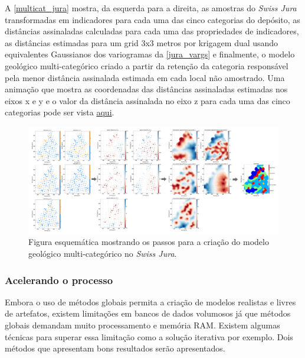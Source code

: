 A \autoref{multicat_jura} mostra, da esquerda para a direita, as amostras do \textit{Swiss Jura} transformadas em indicadores para cada uma das cinco categorias do depósito, as distâncias assinaladas calculadas para cada uma das propriedades de indicadores, as distâncias estimadas para um grid 3x3 metros por krigagem dual usando equivalentes Gaussianos dos variogramas da \autoref{jura_vargs} e finalmente, o modelo geológico multi-categórico criado a partir da retenção da categoria responsável pela menor distância assinalada estimada em cada local não amostrado. Uma animação que mostra as coordenadas das distâncias assinaladas estimadas nos eixos x e y e o valor da distância assinalada no eixo z para cada uma das cinco categorias pode ser vista  \href{https://github.com/robertorolo/assessing_geological_model_uncertainty_with_probability_fields/blob/main/anim_multicat.gif}{aqui}.

\begin{figure}[H]
	\centering
	\caption{\label{multicat_jura}Figura esquemática mostrando os passos para a criação do modelo geológico multi-categórico no \textit{Swiss Jura}.}
	\includegraphics[width=\textwidth]{capitulo_2/imagens/multi category implicit modeling.png}
\end{figure}

\subsubsection{Acelerando o processo}

Embora o uso de métodos globais permita a criação de modelos realistas e livres de artefatos, existem limitações em bancos de dados volumosos já que métodos globais demandam muito processamento e memória RAM. Existem algumas técnicas para superar essa limitação como a solução iterativa \cite{beatson1999fast} por exemplo. Dois métodos que apresentam bons resultados serão apresentados.

 \label{dom_decomp}

